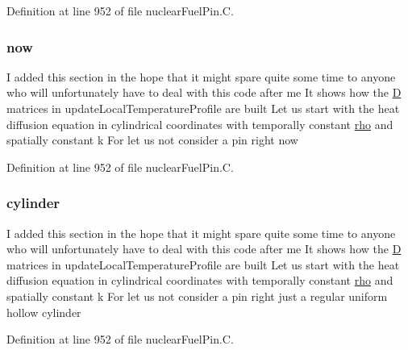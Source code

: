 Definition at line 952 of file nuclear\+Fuel\+Pin.\+C.

\mbox{\label{nuclearFuelPin_8C_a09404a3c5e8ea04b3e44ae4cb130f396}} 
\subsubsection{\texorpdfstring{now}{now}}
{\footnotesize\ttfamily I added this section in the hope that it might spare quite some time to anyone who will unfortunately have to deal with this code after me It shows how the \hyperlink{setXSFieldsSN_8H_a70ac93a527a85b4edf386830643d1561}{D} matrices in update\+Local\+Temperature\+Profile are built Let us start with the heat diffusion equation in cylindrical coordinates with temporally constant \hyperlink{EEqn__1pl_8H_ac955f87ac2b79f02f420cae087fc52b1}{rho} and spatially constant k For let us not consider a pin right now}



Definition at line 952 of file nuclear\+Fuel\+Pin.\+C.

\mbox{\label{nuclearFuelPin_8C_aa5e8becd7f504abaf6e34b6dcd491e94}} 
\subsubsection{\texorpdfstring{cylinder}{cylinder}}
{\footnotesize\ttfamily I added this section in the hope that it might spare quite some time to anyone who will unfortunately have to deal with this code after me It shows how the \hyperlink{setXSFieldsSN_8H_a70ac93a527a85b4edf386830643d1561}{D} matrices in update\+Local\+Temperature\+Profile are built Let us start with the heat diffusion equation in cylindrical coordinates with temporally constant \hyperlink{EEqn__1pl_8H_ac955f87ac2b79f02f420cae087fc52b1}{rho} and spatially constant k For let us not consider a pin right just a regular uniform hollow cylinder}



Definition at line 952 of file nuclear\+Fuel\+Pin.\+C.

